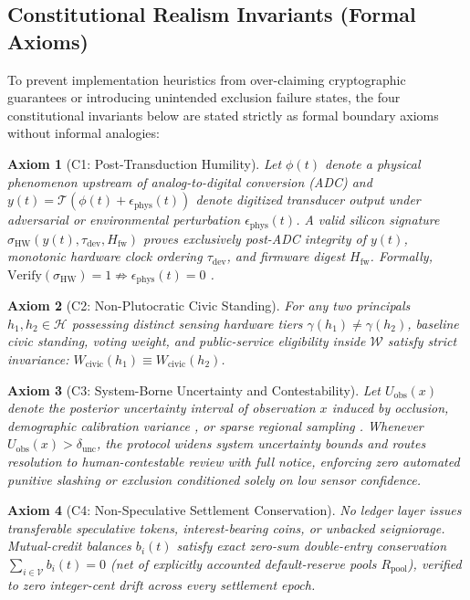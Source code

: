 \documentclass[11pt]{article}
\newtheorem{axiom}{Axiom}
\begin{document}
\subsection{Constitutional Realism Invariants (Formal Axioms)}

To prevent implementation heuristics from over-claiming cryptographic guarantees or introducing unintended exclusion failure states, the four constitutional invariants below are stated strictly as formal boundary axioms without informal analogies:

\begin{axiom}[C1: Post-Transduction Humility]
Let $\phi(t)$ denote a physical phenomenon upstream of analog-to-digital conversion (ADC) and $y(t) = \mathcal{T}(\phi(t) + \epsilon_{\mathrm{phys}}(t))$ denote digitized transducer output under adversarial or environmental perturbation $\epsilon_{\mathrm{phys}}(t)$. A valid silicon signature $\sigma_{\mathrm{HW}}(y(t), \tau_{\mathrm{dev}}, H_{\mathrm{fw}})$ proves exclusively post-ADC integrity of $y(t)$, monotonic hardware clock ordering $\tau_{\mathrm{dev}}$, and firmware digest $H_{\mathrm{fw}}$. Formally, $\mathrm{Verify}(\sigma_{\mathrm{HW}}) = 1 \not\Rightarrow \epsilon_{\mathrm{phys}}(t) = 0$ \citep{fu2018sensors}.
\end{axiom}

\begin{axiom}[C2: Non-Plutocratic Civic Standing]
For any two principals $h_1, h_2 \in \mathcal{H}$ possessing distinct sensing hardware tiers $\gamma(h_1) \neq \gamma(h_2)$, baseline civic standing, voting weight, and public-service eligibility inside $\mathcal{W}$ satisfy strict invariance: $W_{\mathrm{civic}}(h_1) \equiv W_{\mathrm{civic}}(h_2)$.
\end{axiom}

\begin{axiom}[C3: System-Borne Uncertainty and Contestability]
Let $U_{\mathrm{obs}}(x)$ denote the posterior uncertainty interval of observation $x$ induced by occlusion, demographic calibration variance \citep{sjoding2020oximetry}, or sparse regional sampling \citep{crawford2013hidden}. Whenever $U_{\mathrm{obs}}(x) > \delta_{\mathrm{unc}}$, the protocol widens system uncertainty bounds and routes resolution to human-contestable review with full notice, enforcing zero automated punitive slashing or exclusion conditioned solely on low sensor confidence.
\end{axiom}

\begin{axiom}[C4: Non-Speculative Settlement Conservation]
No ledger layer issues transferable speculative tokens, interest-bearing coins, or unbacked seigniorage. Mutual-credit balances $b_i(t)$ satisfy exact zero-sum double-entry conservation $\sum_{i \in \mathcal{V}} b_i(t) = 0$ (net of explicitly accounted default-reserve pools $R_{\mathrm{pool}}$), verified to zero integer-cent drift across every settlement epoch.
\end{axiom}
\end{document}
